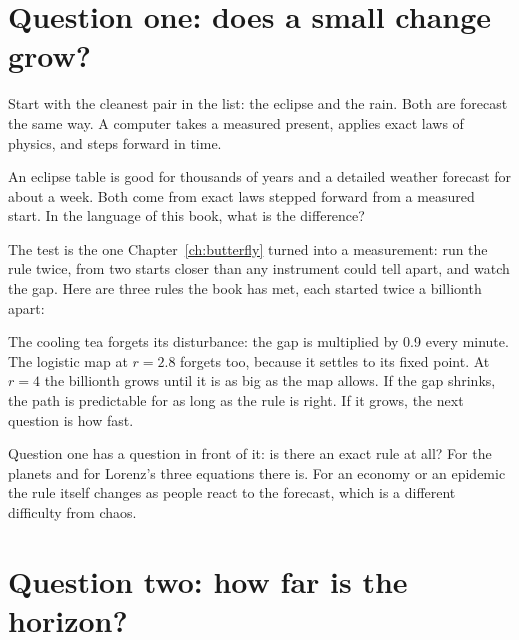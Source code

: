 \section{Question one: does a small change grow?}
\label{sec:ch18-grow}

\noindent
Start with the cleanest pair in the list: the eclipse and the rain. Both are
forecast the same way. A computer takes a measured present, applies exact
laws of physics, and steps forward in time.

\begin{think}
An eclipse table is good for thousands of years and a detailed weather
forecast for about a week. Both come from exact laws stepped forward from a
measured start. In the language of this book, what is the difference?
\end{think}
The test is the one Chapter~\ref{ch:butterfly} turned into a measurement:
run the rule twice, from two starts closer than any instrument could tell
apart, and watch the gap. Here are three rules the book has met, each
started twice a billionth apart:



\noindent
The cooling tea forgets its disturbance: the gap is multiplied by
\num{0.9} every minute. The logistic map at $r = \num{2.8}$ forgets too,
because it settles to its fixed point. At $r = 4$ the billionth grows until
it is as big as the map allows. If the gap shrinks, the path is predictable
for as long as the rule is right. If it grows, the next question is how
fast.

Question one has a question in front of it: is there an exact rule at all?
For the planets and for Lorenz's three equations there is. For an economy or
an epidemic the rule itself changes as people react to the forecast, which
is a different difficulty from chaos.

\section{Question two: how far is the horizon?}
\label{sec:ch18-horizon}

